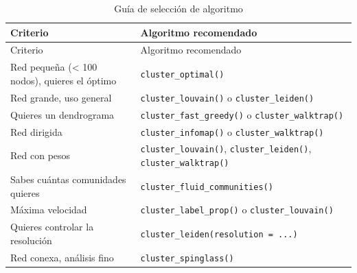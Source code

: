 \documentclass[
  letterpaper,
  DIV=11,
  numbers=noendperiod]{scrreprt}
\begin{document}
\begin{longtable}[]{@{}
  >{\raggedright\arraybackslash}p{}
  >{\raggedright\arraybackslash}p{}@{}}
\caption{Guía de selección de algoritmo}\tabularnewline
\toprule\noalign{}
\begin{minipage}[b]{\linewidth}\raggedright
Criterio
\end{minipage} & \begin{minipage}[b]{\linewidth}\raggedright
Algoritmo recomendado
\end{minipage} \\
\midrule\noalign{}
\endfirsthead
\toprule\noalign{}
\begin{minipage}[b]{\linewidth}\raggedright
Criterio
\end{minipage} & \begin{minipage}[b]{\linewidth}\raggedright
Algoritmo recomendado
\end{minipage} \\
\midrule\noalign{}
\endhead
\bottomrule\noalign{}
\endlastfoot
Red pequeña (\textless{} 100 nodos), quieres el óptimo &
\texttt{cluster\_optimal()} \\
Red grande, uso general & \texttt{cluster\_louvain()} o
\texttt{cluster\_leiden()} \\
Quieres un dendrograma & \texttt{cluster\_fast\_greedy()} o
\texttt{cluster\_walktrap()} \\
Red dirigida & \texttt{cluster\_infomap()} o
\texttt{cluster\_walktrap()} \\
Red con pesos & \texttt{cluster\_louvain()}, \texttt{cluster\_leiden()},
\texttt{cluster\_walktrap()} \\
Sabes cuántas comunidades quieres &
\texttt{cluster\_fluid\_communities()} \\
Máxima velocidad & \texttt{cluster\_label\_prop()} o
\texttt{cluster\_louvain()} \\
Quieres controlar la resolución &
\texttt{cluster\_leiden(resolution\ =\ ...)} \\
Red conexa, análisis fino & \texttt{cluster\_spinglass()} \\
\end{longtable}
\end{document}
